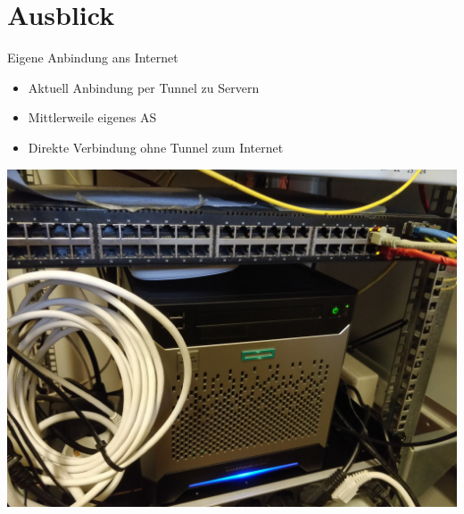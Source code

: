 \documentclass{beamer}
\begin{document}
	\section{Ausblick}
	\begin{frame}{Eigene Anbindung ans Internet}
		\begin{itemize}
			\item Aktuell Anbindung per Tunnel zu Servern
			\item Mittlerweile eigenes AS
			\item Direkte Verbindung ohne Tunnel zum Internet
		\end{itemize}
	\end{frame}
	\begin{frame}
		\centering
		\includegraphics[width=\framewidth]{media/zbau-server.jpg}
	\end{frame}
\end{document}
